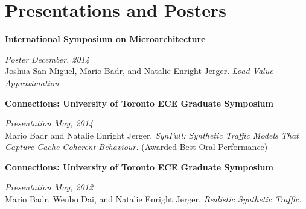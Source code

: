 \section{\sc Presentations and Posters}

{\bf International Symposium on Microarchitecture}
\vspace{-.3cm}

{\em Poster} \hfill {\em December, 2014}\\
Joshua San Miguel, Mario Badr, and Natalie Enright Jerger. \textit{Load Value Approximation}

{\bf Connections: University of Toronto ECE Graduate Symposium}
\vspace{-.3cm}

{\em Presentation} \hfill {\em May, 2014}\\
Mario Badr and Natalie Enright Jerger. \textit{SynFull: Synthetic Traffic Models That Capture Cache Coherent Behaviour.} (Awarded Best Oral Performance)

{\bf Connections: University of Toronto ECE Graduate Symposium}
\vspace{-.3cm}

{\em Presentation} \hfill {\em May, 2012}\\
Mario Badr, Wenbo Dai, and Natalie Enright Jerger. \textit{Realistic Synthetic Traffic.}